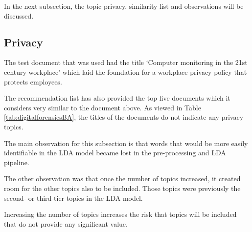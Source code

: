 In the next subsection, the topic privacy, similarity list and observations will be discussed.

\subsection{Privacy}

The test document that was used had the title ‘Computer monitoring in the 21st century workplace’ which laid the foundation for a workplace privacy policy that protects employees.

The recommendation list has also provided the top five documents which it considers very similar to the document above. As viewed in Table \ref{tab:digitalforensicsBA}, the titles of the documents do not indicate any privacy topics.

\begin{table}[]
\centering
{}
\caption{Privacy similarity}
\label{tab:digitalforensicsBA}
\end{table}

The main observation for this subsection is that words that would be more easily identifiable in the LDA model became lost in the pre-processing and LDA pipeline.

The other observation was that once the number of topics increased, it created room for the other topics also to be included. Those topics were previously the second- or third-tier topics in the LDA model.

\begin{lesson}
Increasing the number of topics increases the risk that topics will be included that do not provide any significant value.
\end{lesson}\label{L:more}

